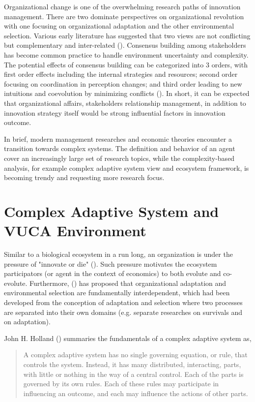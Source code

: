 \documentclass[utf8,english]{gradu3}
\begin{document}
Organizational change is one of the overwhelming research paths of innovation management. There are two dominate perspectives on organizational revolution with one focusing on organizational adaptation and the other environmental selection. Various early literature has suggested that two views are not conflicting but complementary and inter-related (\cite{levinthal1991organizational}). Consensus building among stakeholders has become common practice to handle environment uncertainty and complexity. The potential effects of consensus building can be categorized into 3 orders, with first order effects including the internal strategies and resources; second order focusing on coordination in perception changes; and third order leading to new intuitions and coevolution by minimizing conflicts (\cite{innes1999consensus}). In short, it can be expected that organizational affairs, stakeholders relationship management, in addition to innovation strategy itself would be strong influential factors in innovation outcome.

In brief, modern management researches and economic theories encounter a transition towards complex systems. The definition and behavior of an agent cover an increasingly large set of research topics, while the complexity-based analysis, for example complex adaptive system view and ecosystem framework, is becoming trendy and requesting more research focus.

\section{Complex Adaptive System and VUCA Environment}

Similar to a biological ecosystem in a run long, an organization is under the pressure of "innovate or die" (\cite{drucker1999knowledge}). Such pressure motivates the ecosystem participators (or agent in the context of economics) to both evolute and co-evolute. Furthermore, \citeauthor{levinthal1991organizational} (\citeyear{levinthal1991organizational}) has proposed that organizational adaptation and environmental selection are fundamentally interdependent, which had been developed from the conception of adaptation and selection where two processes are separated into their own domains (e.g. separate researches on survivals and on adaptation).

John H. Holland (\citeyear{holland1992complex}) summaries the fundamentals of a complex adaptive system as,

\begin{quote}
A complex adaptive system has no single governing equation, or rule, that controls the system. Instead, it has many distributed, interacting, parts, with little or nothing in the way of a central control. Each of the parts is governed by its own rules. Each of these rules may participate in influencing an outcome, and each may influence the actions of other parts.
\end{quote}
\end{document}
